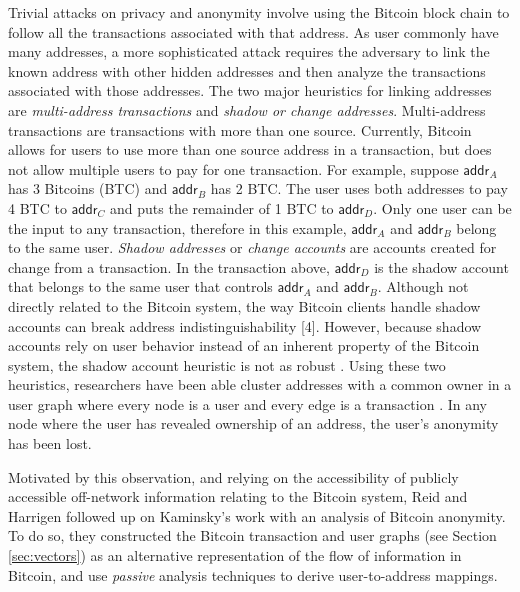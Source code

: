 Trivial attacks on privacy and anonymity involve using the Bitcoin block chain to follow all the transactions associated with that address. As user commonly have many addresses, a more sophisticated attack requires the adversary to link the known address with other hidden addresses and then analyze the transactions associated with those addresses. The two major heuristics for linking addresses are \emph{multi-address transactions} and \emph{shadow or change addresses}. Multi-address transactions are transactions with more than one source. Currently, Bitcoin allows for users to use more than one source address in a transaction, but does not allow multiple users to pay for one transaction. For example, suppose $\mathsf{addr}_A$ has 3 Bitcoins (BTC) and $\mathsf{addr}_B$ has 2 BTC. The user uses both addresses to pay 4 BTC to $\mathsf{addr}_C$ and puts the remainder of 1 BTC to $\mathsf{addr}_D$. Only one user can be the input to any transaction, therefore in this example, $\mathsf{addr}_A$ and $\mathsf{addr}_B$ belong to the same user. \emph{Shadow addresses} or \emph{change accounts} are accounts created for change from a transaction. In the transaction above, $\mathsf{addr}_D$ is the shadow account that belongs to the same user that controls $\mathsf{addr}_A$ and $\mathsf{addr}_B$. Although not directly related to the Bitcoin system, the way Bitcoin clients handle shadow accounts can break address indistinguishability [4]. However, because shadow accounts rely on user behavior instead of an inherent property of the Bitcoin system, the shadow account heuristic is not as robust \cite{Fistful12}. Using these two heuristics, researchers have been able cluster addresses with a common owner in a user graph where every node is a user and every edge is a transaction \cite{Shamir13-bitcoingraph,ReidHarrigan13,Fistful12}. In any node where the user has revealed ownership of an address, the user's anonymity has been lost.

Motivated by this observation, and relying on the accessibility of publicly accessible off-network information relating to the Bitcoin system, Reid and Harrigen \cite{ReidHarrigan13} followed up on Kaminsky's work with an analysis of Bitcoin anonymity. To do so, they constructed the Bitcoin transaction and user graphs (see Section \ref{sec:vectors}) as an alternative representation of the flow of information in Bitcoin, and use \emph{passive} analysis techniques to derive user-to-address mappings. 


